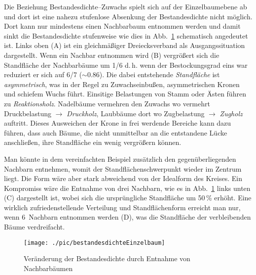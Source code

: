 \documentclass[twocolumn]{scrartcl}
\begin{document}
Die Beziehung Bestandesdichte--Zuwachs spielt sich auf der Einzelbaumebene ab
und dort ist eine nahezu stufenlose Absenkung der Bestandesdichte nicht möglich.
Dort kann nur mindestens einen Nachbarbaum entnommen werden und damit sinkt die
Bestandesdichte stufenweise wie dies in Abb.~\ref{fig:bestandesdichteEinzelbaum}
schematisch angedeutet ist. Links oben (A) ist ein gleichmäßiger Dreiecksverband
als Ausgangssituation dargestellt. Wenn ein Nachbar entnommen wird (B)
vergrößert sich die Standfläche der Nachbarbäume um 1/6 d.\,h. wenn der
Bestockungsgrad eins war reduziert er sich auf 6/7 ($\sim 0.86$). Die dabei
entstehende \emph{Standfläche} ist \emph{asymmetrisch}, was in der Regel zu
Zuwachseinbußen, asymmetrischen Kronen und schiefem Wuchs führt. Einsitige
Belastungen von Stamm oder Ästen führen zu
\emph{Reaktionsholz}. Nadelbäume vermehren den Zuwachs wo
vermehrt Druckbelastung $\rightarrow$
\emph{Druckholz}, Laubbäume dort wo
Zugbelastung $\rightarrow$ \emph{Zugholz}
auftritt. Dieses Ausweichen der Krone in frei werdende Bereiche kann dazu
führen, dass auch Bäume, die nicht unmittelbar an die entstandene Lücke
anschließen, ihre Standfläche ein wenig vergrößern können.

Man könnte in dem vereinfachten Beispiel zusätzlich den gegenüberliegenden
Nachbarn entnehmen, womit der Standflächenschwerpunkt wieder im Zentrum liegt.
Die Form wäre aber stark abweichend von der Idealform des Kreises. Ein
Kompromiss wäre die Entnahme von drei Nachbarn, wie es in
Abb.~\ref{fig:bestandesdichteEinzelbaum} links unten (C) dargestellt ist, wobei
sich die ursprüngliche Standfläche um 50\,\% erhöht. Eine wirklich
zufriedenstellende Verteilung und Standflächenform erreicht man nur, wenn
6~Nachbarn entnommen werden (D), was die Standfläche der verbleibenden Bäume
verdreifacht.

\begin{figure}[htbp]
  \centering
  \texttt{[image: ./pic/bestandesdichteEinzelbaum]}
  \caption{Veränderung der Bestandesdichte durch Entnahme von Nachbarbäumen}
  \label{fig:bestandesdichteEinzelbaum}
\end{figure}
\end{document}
